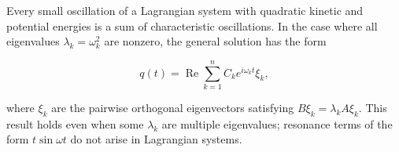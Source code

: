 Every small oscillation of a Lagrangian system with quadratic kinetic and potential energies is a sum of characteristic oscillations. In the case where all eigenvalues $\lambda_k = \omega_k^2$ are nonzero, the general solution has the form

$$q(t) = \operatorname{Re} \sum_{k=1}^{n} C_k e^{i\omega_k t} \xi_k,$$

where $\xi_k$ are the pairwise orthogonal eigenvectors satisfying $B \xi_k = \lambda_k A \xi_k$. This result holds even when some $\lambda_k$ are multiple eigenvalues; resonance terms of the form $t \sin \omega t$ do not arise in Lagrangian systems.
